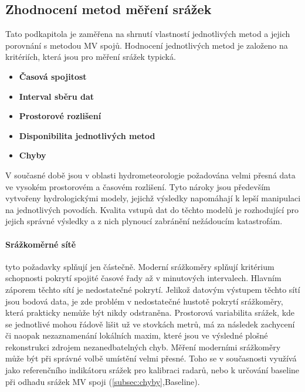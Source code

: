\documentclass[a4paper,12pt]{article}
\begin{document}
\subsection{Zhodnocení metod měření srážek}
Tato podkapitola je zaměřena na shrnutí vlastností jednotlivých metod a jejich porovnání s metodou MV spojů. Hodnocení jednotlivých metod je založeno na kritériích, která jsou pro měření srážek typická.
\begin{itemize}
\item\textbf{Časová spojitost}
\item\textbf{Interval sběru dat}  
\item\textbf{Prostorové rozlišení}
\item\textbf{Disponibilita jednotlivých metod}
\item\textbf{Chyby}
\end{itemize}
V současné době jsou v oblasti hydrometeorologie požadována velmi přesná data ve vysokém prostorovém a časovém rozlišení. Tyto nároky jsou především vytvořeny hydrologickými modely, jejichž výsledky napomáhají k lepší manipulaci na jednotlivých povodích. Kvalita vstupů dat do těchto modelů je rozhodující pro jejich správné výsledky a z nich plynoucí zabránění nežádoucím katastrofám.

\paragraph*{Srážkoměrné sítě} 
tyto požadavky splňují jen částečně. Moderní srážkoměry splňují kritérium schopnosti pokrytí spojité časové řady až v minutových intervalech. Hlavním záporem těchto sítí je nedostatečné pokrytí. Jelikož datovým výstupem těchto sítí jsou bodová data, je zde problém v nedostatečné hustotě pokrytí srážkoměry, která prakticky nemůže být nikdy odstraněna. Prostorová variabilita srážek, kde se jednotlivé mohou řádově lišit už ve stovkách metrů, má za následek zachycení či naopak nezaznamenání lokálních maxim, které jsou ve výsledné plošné rekonstrukci zdrojem nezanedbatelných chyb. Měření moderními srážkoměry může být při správné volbě umístění velmi přesné. Toho se v současnosti využívá jako referenčního indikátoru srážek pro kalibraci radarů, nebo k určování baseline při odhadu srážek MV spoji (\ref{subsec:chyby},Baseline).
\end{document}
